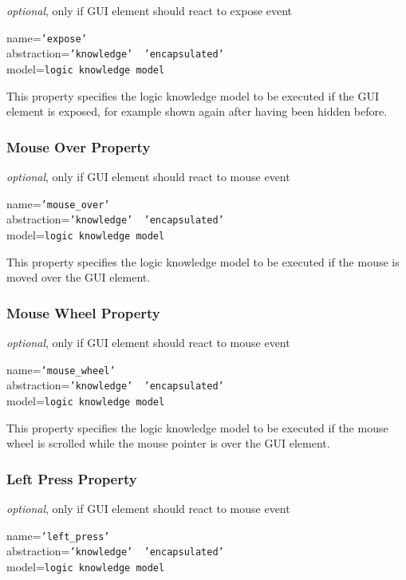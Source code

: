 \emph{optional}, only if GUI element should react to expose event

name=\texttt{'expose'}\\
abstraction=\texttt{'knowledge' \vline\ 'encapsulated'}\\
model=\texttt{logic knowledge model}

This property specifies the logic knowledge model to be executed if the GUI
element is exposed, for example shown again after having been hidden before.

\subsubsection{Mouse Over Property}

\emph{optional}, only if GUI element should react to mouse event

name=\texttt{'mouse\_over'}\\
abstraction=\texttt{'knowledge' \vline\ 'encapsulated'}\\
model=\texttt{logic knowledge model}

This property specifies the logic knowledge model to be executed if the mouse
is moved over the GUI element.

\subsubsection{Mouse Wheel Property}

\emph{optional}, only if GUI element should react to mouse event

name=\texttt{'mouse\_wheel'}\\
abstraction=\texttt{'knowledge' \vline\ 'encapsulated'}\\
model=\texttt{logic knowledge model}

This property specifies the logic knowledge model to be executed if the mouse
wheel is scrolled while the mouse pointer is over the GUI element.

\subsubsection{Left Press Property}

\emph{optional}, only if GUI element should react to mouse event

name=\texttt{'left\_press'}\\
abstraction=\texttt{'knowledge' \vline\ 'encapsulated'}\\
model=\texttt{logic knowledge model}

